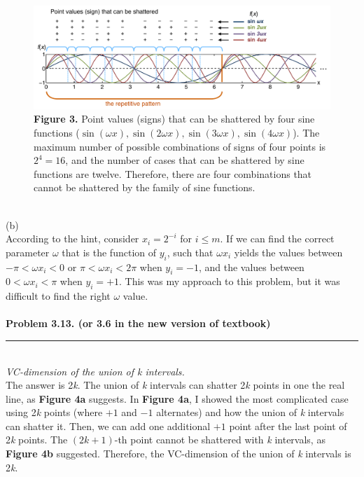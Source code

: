 \documentclass[letterpaper,11pt,notitlepage]{article}
\begin{document}
\begin{figure}[ht!]
	\hspace*{-2cm}
	\centering
	\includegraphics[width=16cm]{Figure3_12_ela}
	\captionsetup{width=.8\textwidth}
	\caption{\textbf{Figure 3.} Point values (signs) that can be shattered by four sine functions ($\sin(\omega x), \sin(2\omega x), \sin(3\omega x), \sin(4\omega x)$). The maximum number of possible combinations of signs of four points is $2^4 = 16$, and the number of cases that can be shattered by sine functions are twelve. Therefore, there are four combinations that cannot be shattered by the family of sine functions.} 
\end{figure} \leavevmode \\

\noindent (b)\\
According to the hint, consider $x_i = 2^{-i}$ for $i \le m$. If we can find the correct parameter $\omega$ that is the function of $y_i$, such that $\omega x_i$ yields the values between $-\pi<\omega x_i<0$ or $\pi<\omega x_i<2\pi$ when $y_i=-1$, and the values between $0<\omega x_i<\pi$ when $y_i=+1$. This was my approach to this problem, but it was difficult to find the right $\omega$ value.\\\\

\hspace*{-1cm}\textbf{Problem 3.13. (or 3.6 in the new version of textbook)}  \rule{2.5cm}{0.4pt}\\
\noindent\textit{VC-dimension of the union of k intervals.}\\

\noindent The answer is 2\textit{k}. The union of \textit{k} intervals can shatter 2\textit{k} points in one the real line, as \textbf{Figure 4a} suggests. In \textbf{Figure 4a}, I showed the most complicated case using 2\textit{k} points (where $+1$ and $-1$ alternates) and how the union of \textit{k} intervals can shatter it. Then, we can add one additional $+1$ point after the last point of 2\textit{k} points. The $(2k+1)$-th point cannot be shattered with \textit{k} intervals, as \textbf{Figure 4b} suggested. Therefore, the VC-dimension of the union of \textit{k} intervals is 2\textit{k}.
\end{document}
